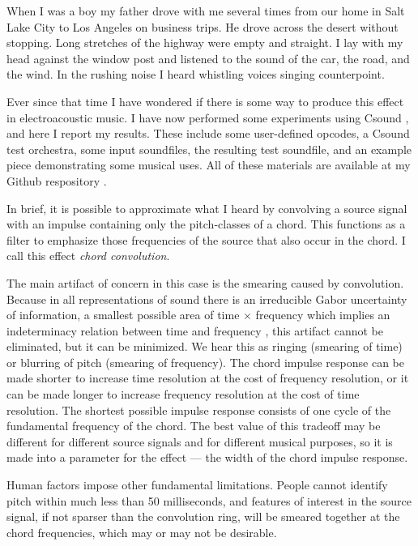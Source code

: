 \documentclass[runningheads,a4paper]{llncs}
\begin{document}
When I was a boy my father drove with me several times from our home in Salt 
Lake City to Los Angeles on business trips. He drove across the desert without 
stopping. Long stretches of the highway were empty and straight. I lay with my 
head against the window post and listened to the sound of the car, the road, 
and the wind. In the rushing noise I heard whistling voices singing 
counterpoint.

Ever since that time I have wondered if there is some way to produce this 
effect in electroacoustic music. I have now performed some experiments using 
Csound \cite{csound_home}, and here I report my results. These include some 
user-defined opcodes, a Csound test orchestra, some input soundfiles, the 
resulting test soundfile, and an example piece demonstrating some musical 
uses. All of these materials are available at my Github respository 
\cite{gogins_github_io}.

In brief, it is possible to approximate what I heard by convolving a source 
signal with an impulse containing only the pitch-classes of a chord. This 
functions as a filter to emphasize those frequencies of the source that also 
occur in the chord. I call this effect \emph{chord convolution}.

The main artifact of concern in this case is the smearing caused by 
convolution. Because in all representations of sound there is an irreducible 
Gabor uncertainty of information, a smallest possible area of time $\times$ 
frequency which implies an indeterminacy relation between time and frequency 
\cite{gabor1946theory}, this artifact cannot be eliminated, but it can be 
minimized. We hear this as ringing (smearing of time) or blurring of pitch 
(smearing of frequency). The chord impulse response can be made shorter to 
increase time resolution at the cost of frequency resolution, or it can be made 
longer to increase frequency resolution at the cost of time resolution. The 
shortest possible impulse response consists of one cycle of the fundamental 
frequency of the chord. The best value of this tradeoff may be different for 
different source signals and for different musical purposes, so it is made into 
a parameter for the effect --- the width of the chord impulse response.

Human factors impose other fundamental limitations. People cannot identify 
pitch within much less than 50 milliseconds, and features of interest in the 
source signal, if not sparser than the convolution ring, will be smeared 
together at the chord frequencies, which may or may not be desirable.
\end{document}
